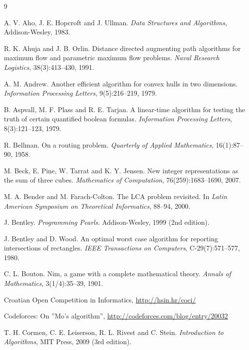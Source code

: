 \renewcommand{\bibname}{参考文献}
\begin{thebibliography}{9}

  A. V. Aho, J. E. Hopcroft and J. Ullman.
  \emph{Data Structures and Algorithms},
  Addison-Wesley, 1983.

  R. K. Ahuja and J. B. Orlin.
  Distance directed augmenting path algorithms for maximum flow and parametric maximum flow problems.
  \emph{Naval Research Logistics}, 38(3):413--430, 1991.

  A. M. Andrew.
  Another efficient algorithm for convex hulls in two dimensions.
  \emph{Information Processing Letters}, 9(5):216--219, 1979.

  B. Aspvall, M. F. Plass and R. E. Tarjan.
  A linear-time algorithm for testing the truth of certain quantified boolean formulas.
  \emph{Information Processing Letters}, 8(3):121--123, 1979.

  R. Bellman.
  On a routing problem.
  \emph{Quarterly of Applied Mathematics}, 16(1):87--90, 1958.

  M. Beck, E. Pine, W. Tarrat and K. Y. Jensen.
  New integer representations as the sum of three cubes.
  \emph{Mathematics of Computation}, 76(259):1683--1690, 2007.

  M. A. Bender and M. Farach-Colton.
  The LCA problem revisited. In
  \emph{Latin American Symposium on Theoretical Informatics}, 88--94, 2000.

  J. Bentley.
  \emph{Programming Pearls}.
  Addison-Wesley, 1999 (2nd edition).

  J. Bentley and D. Wood.
  An optimal worst case algorithm for reporting intersections of rectangles.
  \emph{IEEE Transactions on Computers}, C-29(7):571--577, 1980.

  C. L. Bouton.
  Nim, a game with a complete mathematical theory.
  \emph{Annals of Mathematics}, 3(1/4):35--39, 1901.


  Croatian Open Competition in Informatics, \url{http://hsin.hr/coci/}

  Codeforces: On ''Mo's algorithm'',
  \url{http://codeforces.com/blog/entry/20032}

  T. H. Cormen, C. E. Leiserson, R. L. Rivest and C. Stein.
  \emph{Introduction to Algorithms}, MIT Press, 2009 (3rd edition).


\end{thebibliography}
